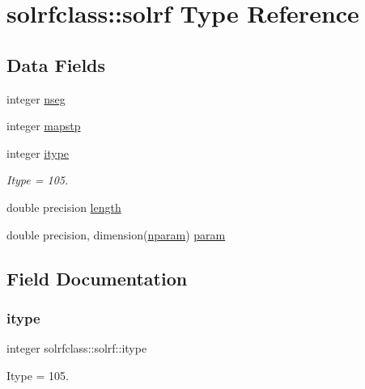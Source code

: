 \hypertarget{structsolrfclass_1_1solrf}{}\section{solrfclass\+::solrf Type Reference}
\label{structsolrfclass_1_1solrf}
\subsection*{Data Fields}
\begin{DoxyCompactItemize}
\item 
integer \mbox{\hyperlink{structsolrfclass_1_1solrf_a1825472ba9b6dfe1d7ca72bfc85f0532}{nseg}}
\item 
integer \mbox{\hyperlink{structsolrfclass_1_1solrf_af5533539dedb70fb85e93b1a76a7a55d}{mapstp}}
\item 
integer \mbox{\hyperlink{structsolrfclass_1_1solrf_af3ec222ea47a2e9d6dea703d94927750}{itype}}
\begin{DoxyCompactList}\small\item\em Itype = 105. \end{DoxyCompactList}\item 
double precision \mbox{\hyperlink{structsolrfclass_1_1solrf_a6fbb4ce6f8918840cadf9ee8e16769f9}{length}}
\item 
double precision, dimension(\mbox{\hyperlink{namespacesolrfclass_a01b965e25069cff9fb1797fbbcb9939d}{nparam}}) \mbox{\hyperlink{structsolrfclass_1_1solrf_a10deafd1e7cbd79c86c62766f73105f9}{param}}
\end{DoxyCompactItemize}


\subsection{Field Documentation}
\mbox{\label{structsolrfclass_1_1solrf_af3ec222ea47a2e9d6dea703d94927750}} 
\subsubsection{\texorpdfstring{itype}{itype}}
{\footnotesize\ttfamily integer solrfclass\+::solrf\+::itype}



Itype = 105. 

\mbox{\label{structsolrfclass_1_1solrf_a6fbb4ce6f8918840cadf9ee8e16769f9}} 
